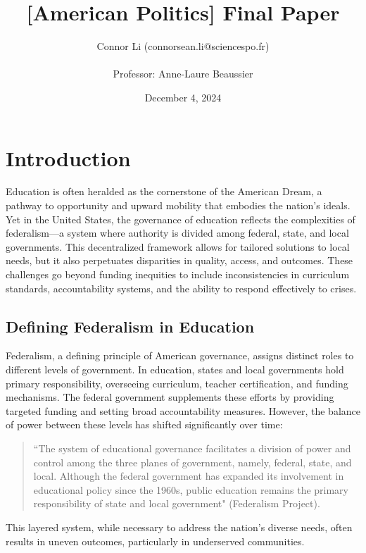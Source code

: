 \documentclass[11pt]{extarticle}
\title{[American Politics] Final Paper}
\author{Connor Li (connorsean.li$@$sciencespo.fr)\\
\\
Professor: Anne-Laure Beaussier}
\date{December 4, 2024}
\begin{document}
\maketitle

\tableofcontents



\pagebreak

\section{Introduction}
Education is often heralded as the cornerstone of the American Dream, a pathway to opportunity and upward mobility that embodies the nation’s ideals. Yet in the United States, the governance of education reflects the complexities of federalism—a system where authority is divided among federal, state, and local governments. This decentralized framework allows for tailored solutions to local needs, but it also perpetuates disparities in quality, access, and outcomes. These challenges go beyond funding inequities to include inconsistencies in curriculum standards, accountability systems, and the ability to respond effectively to crises.
\subsection{Defining Federalism in Education}
Federalism, a defining principle of American governance, assigns distinct roles to different levels of government. In education, states and local governments hold primary responsibility, overseeing curriculum, teacher certification, and funding mechanisms. The federal government supplements these efforts by providing targeted funding and setting broad accountability measures. However, the balance of power between these levels has shifted significantly over time:
\begin{quote}
    ``The system of educational governance facilitates a division of power and control among the three planes of government, namely, federal, state, and local. Although the federal government has expanded its involvement in educational policy since the 1960s, public education remains the primary responsibility of state and local government" (Federalism Project).
\end{quote}
This layered system, while necessary to address the nation’s diverse needs, often results in uneven outcomes, particularly in underserved communities.
\end{document}
